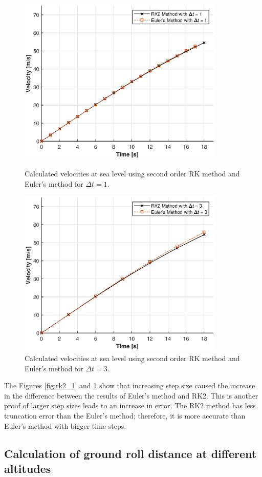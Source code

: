 \documentclass[letterpaper,12pt]{article}
\begin{document}
\begin{figure}[!h]
        \centering
        \includegraphics[max height=8cm]{graphs/compare1.eps}
        \caption{Calculated velocities at sea level using second order RK method and Euler's method for $\Delta t=1$.}
        \label{fig:rk2_1}

        \includegraphics[max height=8cm]{graphs/compare3.eps}
        \caption{Calculated velocities at sea level using second order RK method and Euler's method for $\Delta t=3$.}
        \label{fig:rk2_3}
\end{figure}
The Figures \ref{fig:rk2_1} and \ref{fig:rk2_3} show that increasing step size caused the increase in the 
difference between the results of Euler's method and RK2. This is another proof of larger step sizes leads to an increase in error.
The RK2 method has less truncation error than the Euler's method; therefore, it is more accurate than Euler's method with bigger 
time steps.

\newpage
\subsection{Calculation of ground roll distance at different altitudes}
\end{document}

